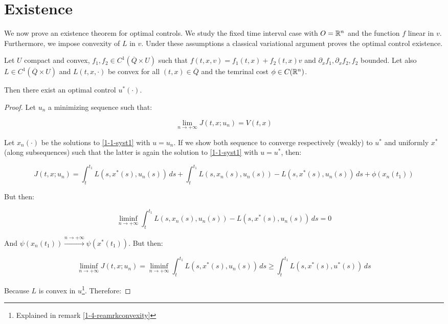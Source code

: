 \section{Existence}

We now prove an existence theorem for optimal controls.
We study the fixed time interval case with $O=\mathbb{R}^n$ and the function $f$ linear in $v$.
Furthermore, we impose convexity of $L$ in $v$. Under these assumptions a classical variational
argument proves the optimal control existence.
\begin{theorem}
    Let $U$ compact and convex, $f_1,f_2\in C^1(\overline{Q}\times U)$ such that $f(t,x,v)=f_1(t,x)+f_2(t,x)v$ and $\partial_xf_{1},\partial_xf_2,f_2$ bounded.
    Let also $L\in C^1(\overline{Q}\times U)$ and $L(t,x,\cdot)$ be convex for all $(t,x)\in\overline{Q}$ and the temrinal cost $\phi\in C(\mathbb{R}^n)$.

    Then there exist an optimal control $u^{\ast}(\cdot)$.

    \begin{proof}
        Let $u_n$ a minimizing sequence such that:

        \begin{equation}
            \lim_{n\to+\infty} J(t,x;u_n) = V(t,x)
        \end{equation}

        Let $x_n(\cdot)$ be the solutions to \ref{1-1-syst1} with $u=u_n$. If we show both sequence to converge respectively 
        (weakly) to $u^{\ast}$ and uniformly $x^{\ast}$ (along subsequences) such that the latter is again the solution to \ref{1-1-syst1} with $u=u^{\ast}$, then:

        \[J(t,x;u_n) = \int_t^{t_1} L(s,x^{\ast}(s),u_n(s)) \,ds + \int_t^{t_1} L(s,x_n(s),u_n(s)) - L(s,x^{\ast}(s),u_n(s)) \,ds + \phi(x_n(t_1))\]

        But then:

        \[\liminf_{n\to+\infty} \int_t^{t_1} L(s,x_n(s),u_n(s)) - L(s,x^{\ast}(s),u_n(s)) \,ds = 0\]

        And $\psi(x_n(t_1))\xrightarrow{n\to+\infty}\psi(x^{\ast}(t_1))$. But then:

        \begin{equation}\label{1-4-existenceliminf}
            \liminf_{n\to+\infty} J(t,x;u_n) = \liminf_{n\to+\infty} \int_t^{t_1} L(s,x^{\ast}(s),u_n(s)) \,ds \geq \int_t^{t_1} L(s,x^{\ast}(s),u^{\ast}(s)) \,ds 
        \end{equation}

        Because $L$ is convex in $u$\footnote{Explained in remark \ref{1-4-reamrkconvexity}}. Therefore:


\end{proof}
\end{theorem}
